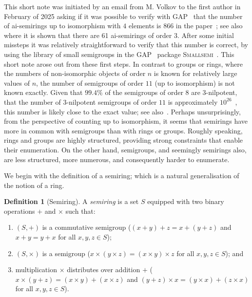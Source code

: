 \documentclass{article}
\theoremstyle{definition}
\newtheorem{defn}{Definition}[section]
\theoremstyle{plain}
\newcommand{\GAP}{\textsc{GAP}~\cite{GAP4}\xspace}
\newcommand{\Smallsemi}{\textsc{Smallsemi}~\cite{Smallsemi}\xspace}
\begin{document}
This short note was initiated by an email from M. Volkov to the first author in
February of 2025 asking if it was possible to verify with \GAP that the number
of ai-semirings up to isomorphism with $4$ elements is $866$ in the
paper~\cite{Ren2025}; see also~\cite{Zhao2020} where it is shown that there are
61 ai-semirings of order $3$. After some initial missteps it was relatively
straightforward to verify that this number is correct, by using the library
of small semigroups in the \GAP package \Smallsemi. This short note arose
out from these first steps. In contrast to groups or rings, where the
numbers of non-isomorphic objects of order $n$ is known for relatively large
values of $n$, the number of semigroups of order $11$ (up to isomorphism) is
not known exactly. Given that $99.4\%$ of the semigroups of order $8$ are
$3$-nilpotent, that the number of $3$-nilpotent semigroups of order $11$ is
approximately $10 ^ {26}$~\cite{Distler2012ab}, this number is likely close
to the exact value; see also~\cite{Kleitman1976}. Perhaps unsurprisingly,
from the perspective of counting up to isomorphism, it seems that semirings
have more in common with semigroups than with rings or groups. Roughly
speaking, rings and groups are highly structured, providing strong
constraints that enable their enumeration. On the other hand, semigroups,
and seemingly semirings also, are less structured, more numerous, and
consequently harder to enumerate.

We begin with the definition of a semiring; which is a natural generalisation
of the notion of a ring.

\begin{defn}[Semiring]
  \label{def:semiring}
  A \emph{semiring} is a set \(S\) equipped with two binary
  operations \(+\) and  \(\times\) such that:
  \begin{enumerate}
    \item \((S, +)\) is a commutative semigroup ($(x + y) + z = x + (y + z)$
      and $x + y = y + x$ for all $x, y, z\in S$);
    \item \((S, \times)\) is a semigroup ($x\times (y \times z) = (x\times
      y)\times z$ for all $x,y, z\in S$); and
    \item multiplication $\times$ distributes over addition $+$
      ($x \times (y + z) = (x \times y) + (x \times z)$ and
      $(y + z) \times x = (y \times x) + (z \times x)$ for all $x, y, z \in S$).
  \end{enumerate}
\end{defn}
\end{document}
